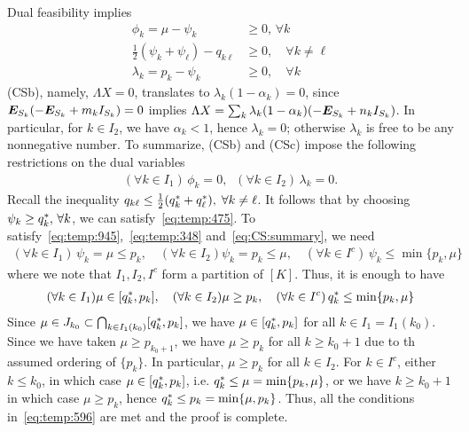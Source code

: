 Dual feasibility implies
\begin{align}
  \phi_k = \mu - \psi_k &\ge 0,\, \forall k \label{eq:temp:945}\\
  \frac12(\psi_k + \psi_\ell) - q_{k\ell} &\ge 0, \quad \forall k \neq \ell \label{eq:temp:475}\\
  \lambda_k = p_k - \psi_k &\ge 0,\quad  \forall k \label{eq:temp:348}
\end{align}
%
(CSb), namely, $\Lambda X = 0$, translates to $\lambda_k (1-\alpha_k) = 0$, since $\bm{E}_{S_k} (-\bm{E}_{S_k} + m_k I_{S_k}) = 0$ implies
$\Lambda X = \sum_k \lambda_k(1-\alpha_k) (-\bm{E}_{S_k} + n_k I_{S_k})$.
In particular, for $k \in I_2$, we have $\alpha_k < 1$, hence $\lambda_k = 0$; otherwise $\lambda_k$ is free to be any nonnegative number. To summarize, (CSb) and (CSc) impose the following restrictions on the dual variables
\begin{align}
  (\forall k \in I_1) \, \phi_k = 0, \;\; (\forall k \in I_2)\, \lambda_k = 0.
  \label{eq:CS:summary}
\end{align}
Recall the inequality $q_{k\ell} \le \frac{1}{2} (q^*_k+q^*_\ell), \; \forall k\neq \ell$. It follows that by choosing $\psi_k \ge q^*_k,\, \forall k$, we can satisfy~\eqref{eq:temp:475}. To satisfy~\eqref{eq:temp:945},~\eqref{eq:temp:348} and~\eqref{eq:CS:summary}, we need
\begin{align}
  (\forall k \in I_1) \,\psi_k = \mu \le p_k, \quad (\forall k \in I_2) \psi_k = p_k \le \mu, \quad (\forall k \in I^c) \,\psi_k \le \min\{p_k, \mu\} 
\end{align}
where we note that $I_1,I_2,I^c$ form a partition of $[K]$. Thus, it is enough to have
\begin{align}\label{eq:temp:596}
  (\forall k \in I_1) \mu \in [q^*_k,p_k], \quad (\forall k \in I_2) \mu \ge p_k, \quad (\forall k \in I^c) \,q^*_k \le \min\{p_k, \mu\} 
\end{align}
Since $\mu \in J_{k_0} \subset \bigcap_{k \in I_1(k_0)} [q^*_k,p_k]$, we have $\mu \in [q^*_k,p_k]$ for all $k \in I_1 = I_1(k_0)$. Since we have taken $\mu \ge p_{k_0+1}$, we have $\mu \ge p_k$ for all $k \ge k_0+1$ due to th assumed ordering of $\{p_k\}$. In particular, $\mu \ge p_k$ for all $k \in I_2$. For $k \in I^c$, either $ k \le k_0$, in which case $\mu \in [q^*_k,p_k]$, i.e. $q^*_k \le \mu = \min\{p_k,\mu\}$, or we have $k \ge k_0+1$ in which case $\mu \ge p_k$, hence $q^*_k \le p_k = \min\{\mu,p_k\}$. Thus, all the conditions in~\eqref{eq:temp:596} are met and the proof is complete.


